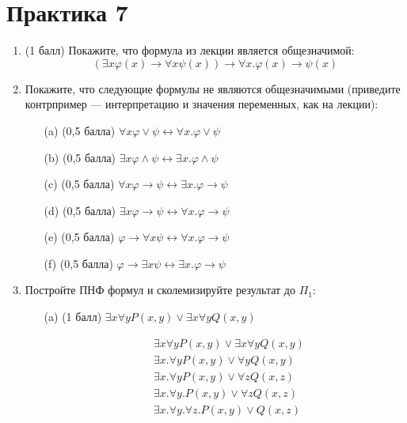 \section{Практика 7}
\begin{enumerate}
    \item (1 балл) Покажите, что формула из лекции является общезначимой:
    $$(\exists x\varphi(x) \rightarrow \forall x\psi(x)) \rightarrow \forall x. \varphi(x) \rightarrow \psi(x)$$
    \item Покажите, что следующие формулы не являются общезначимыми (приведите контрпример — интерпретацию и значения переменных, как на лекции):
    \begin{itemize}
        \item[(a)] (0,5 балла) $\forall x\varphi \lor \psi \leftrightarrow \forall x. \varphi \lor \psi$
        \item[(b)] (0,5 балла) $\exists x\varphi \land \psi \leftrightarrow \exists x. \varphi \land \psi$
        \item[(c)] (0,5 балла) $\forall x\varphi \rightarrow \psi \leftrightarrow \exists x. \varphi \rightarrow \psi$
        \item[(d)] (0,5 балла) $\exists x\varphi \rightarrow \psi \leftrightarrow \forall x. \varphi \rightarrow \psi$
        \item[(e)] (0,5 балла) $\varphi \rightarrow \forall x\psi \leftrightarrow \forall x. \varphi \rightarrow \psi$
        \item[(f)] (0,5 балла) $\varphi \rightarrow \exists x\psi \leftrightarrow \exists x. \varphi \rightarrow \psi$
    \end{itemize}
    \item Постройте ПНФ формул и сколемизируйте результат до $\Pi_1$:
    \begin{itemize}
        \item[(a)] (1 балл) $\exists x\forall y P(x, y) \lor \exists x\forall y Q(x, y)$
        \begin{solution}
            \begin{align*}
                &\exists x\forall y P(x, y) \lor \exists x\forall y Q(x, y) \\
                &\exists x . \forall y P(x, y) \lor \forall y Q(x, y) \\
                &\exists x . \forall y P(x, y) \lor \forall z Q(x, z) \\
                &\exists x . \forall y. P(x, y) \lor \forall z Q(x, z) \\
                &\exists x . \forall y. \forall z . P(x, y) \lor Q(x, z) \\

\end{align*}
\end{solution}
\end{itemize}
\end{enumerate}
